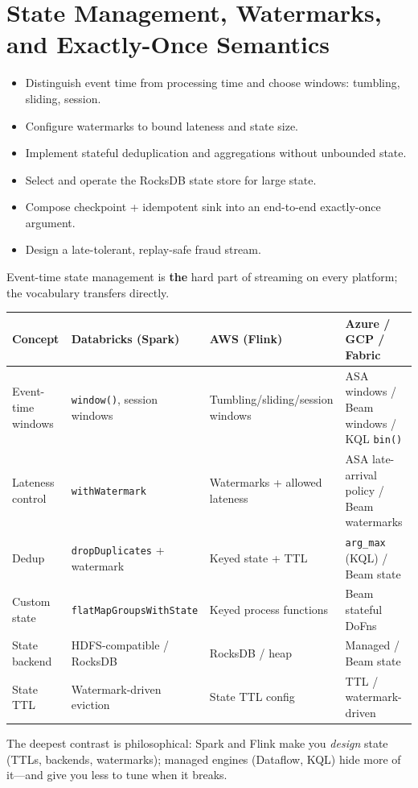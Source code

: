 \chapter{State Management, Watermarks, and Exactly-Once Semantics}
%
%
\begin{objectives}
\begin{itemize}
    \item Distinguish event time from processing time and choose windows: tumbling, sliding, session.
    \item Configure watermarks to bound lateness and state size.
    \item Implement stateful deduplication and aggregations without unbounded state.
    \item Select and operate the RocksDB state store for large state.
    \item Compose checkpoint + idempotent sink into an end-to-end exactly-once argument.
    \item Design a late-tolerant, replay-safe fraud stream.
\end{itemize}
\end{objectives}

\begin{crosscloud}
Event-time state management is \textbf{the} hard part of streaming on every platform; the
vocabulary transfers directly.

\vspace{2mm}
{\footnotesize
\begin{tabular}{@{}p{3.0cm}p{3.4cm}p{3.2cm}p{3.2cm}@{}}
\toprule
\textbf{Concept} & \textbf{Databricks (Spark)} & \textbf{AWS (Flink)} & \textbf{Azure / GCP / Fabric} \\
\midrule
Event-time windows & \texttt{window()}, session windows & Tumbling/sliding/session windows & ASA windows / Beam windows / KQL \texttt{bin()} \\
Lateness control & \texttt{withWatermark} & Watermarks + allowed lateness & ASA late-arrival policy / Beam watermarks \\
Dedup & \texttt{dropDuplicates} + watermark & Keyed state + TTL & \texttt{arg\_max} (KQL) / Beam state \\
Custom state & \texttt{flatMapGroupsWithState} & Keyed process functions & Beam stateful DoFns \\
State backend & HDFS-compatible / RocksDB & RocksDB / heap & Managed / Beam state \\
State TTL & Watermark-driven eviction & State TTL config & TTL / watermark-driven \\
\bottomrule
\end{tabular}}

\vspace{1mm}
The deepest contrast is philosophical: Spark and Flink make you \emph{design} state (TTLs,
backends, watermarks); managed engines (Dataflow, KQL) hide more of it---and give you less to
tune when it breaks.
\end{crosscloud}

